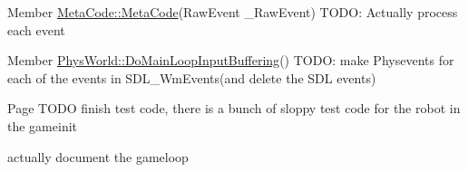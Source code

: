 \label{todo__todo000002}
\hypertarget{todo__todo000002}{}
 
\begin{DoxyDescription}
\item[Member \hyperlink{classMetaCode_ad0a739796fa1de2991c196d8ee7b19b2}{MetaCode::MetaCode}(RawEvent \_\-RawEvent) ]TODO: Actually process each event 
\end{DoxyDescription}

\label{todo__todo000006}
\hypertarget{todo__todo000006}{}
 
\begin{DoxyDescription}
\item[Member \hyperlink{classPhysWorld_a81b3f0dcc0a90d039623f696343e6e9c}{PhysWorld::DoMainLoopInputBuffering}() ]TODO: make Physevents for each of the events in SDL\_\-WmEvents(and delete the SDL events) 
\end{DoxyDescription}

\label{todo__todo000004}
\hypertarget{todo__todo000004}{}
 
\begin{DoxyDescription}
\item[Page \hyperlink{MainLoop}{} ]TODO finish test code, there is a bunch of sloppy test code for the robot in the gameinit 

actually document the gameloop 
\end{DoxyDescription}